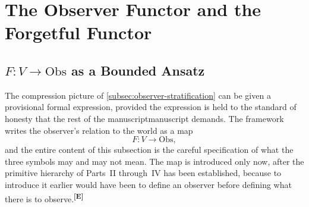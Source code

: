 \documentclass[12pt,a4paper,twoside]{article}
\theoremstyle{plain}
\theoremstyle{definition}
\theoremstyle{remark}
\newcommand{\catmark}[1]{\textsuperscript{\textsf{\textbf{[#1]}}}}
\begin{document}

\section{The Observer Functor and the Forgetful Functor}
\label{sec:observer-functor}

\subsection{\texorpdfstring{$F\colon V \to \mathrm{Obs}$}{F: V to Obs} as a Bounded Ansatz}
\label{subsec:observer-functor-ansatz}

The compression picture of \cref{subsec:observer-stratification} can be given a provisional formal expression, provided the expression is held to the standard of honesty that the rest of the manuscriptmanuscript demands. The framework writes the observer's relation to the world as a map
\[
 F\colon V \longrightarrow \mathrm{Obs},
\]
and the entire content of this subsection is the careful specification of what the three symbols may and may not mean. The map is introduced only now, after the primitive hierarchy of Parts~II through~IV has been established, because to introduce it earlier would have been to define an observer before defining what there is to observe.\catmark{E}
\end{document}

